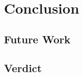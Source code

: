 %
\chapter{Conclusion}
\label{sec:conclusion}

\section{Future Work}
\label{sec:conclusion:future-work}

\section{Verdict}
\label{sec:conclusion:verdict}
